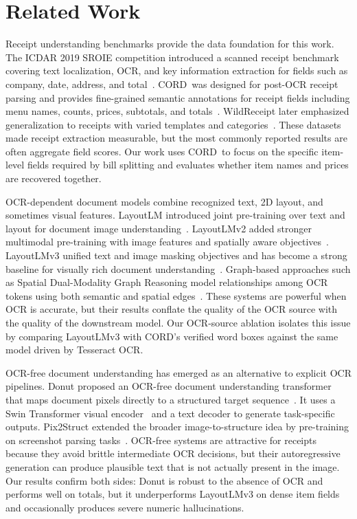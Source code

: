 \documentclass[9pt,twocolumn,twoside]{extarticle}
\newcommand{\cord}{\textsc{CORD}}
\begin{document}
\section{Related Work}
\label{sec:related}

Receipt understanding benchmarks provide the data foundation for this work. The ICDAR 2019 SROIE competition introduced a scanned receipt benchmark covering text localization, OCR, and key information extraction for fields such as company, date, address, and total~\cite{huang2019sroie}. \cord\ was designed for post-OCR receipt parsing and provides fine-grained semantic annotations for receipt fields including menu names, counts, prices, subtotals, and totals~\cite{park2019cord}. WildReceipt later emphasized generalization to receipts with varied templates and categories~\cite{sun2021sdmgr}. These datasets made receipt extraction measurable, but the most commonly reported results are often aggregate field scores. Our work uses \cord\ to focus on the specific item-level fields required by bill splitting and evaluates whether item names and prices are recovered together.

OCR-dependent document models combine recognized text, 2D layout, and sometimes visual features. LayoutLM introduced joint pre-training over text and layout for document image understanding~\cite{xu2020layoutlm}. LayoutLMv2 added stronger multimodal pre-training with image features and spatially aware objectives~\cite{xu2021layoutlmv2}. LayoutLMv3 unified text and image masking objectives and has become a strong baseline for visually rich document understanding~\cite{huang2022layoutlmv3}. Graph-based approaches such as Spatial Dual-Modality Graph Reasoning model relationships among OCR tokens using both semantic and spatial edges~\cite{sun2021sdmgr}. These systems are powerful when OCR is accurate, but their results conflate the quality of the OCR source with the quality of the downstream model. Our OCR-source ablation isolates this issue by comparing LayoutLMv3 with \cord's verified word boxes against the same model driven by Tesseract OCR.

OCR-free document understanding has emerged as an alternative to explicit OCR pipelines. Donut proposed an OCR-free document understanding transformer that maps document pixels directly to a structured target sequence~\cite{kim2022donut}. It uses a Swin Transformer visual encoder~\cite{liu2021swin} and a text decoder to generate task-specific outputs. Pix2Struct extended the broader image-to-structure idea by pre-training on screenshot parsing tasks~\cite{lee2023pix2struct}. OCR-free systems are attractive for receipts because they avoid brittle intermediate OCR decisions, but their autoregressive generation can produce plausible text that is not actually present in the image. Our results confirm both sides: Donut is robust to the absence of OCR and performs well on totals, but it underperforms LayoutLMv3 on dense item fields and occasionally produces severe numeric hallucinations.
\end{document}
